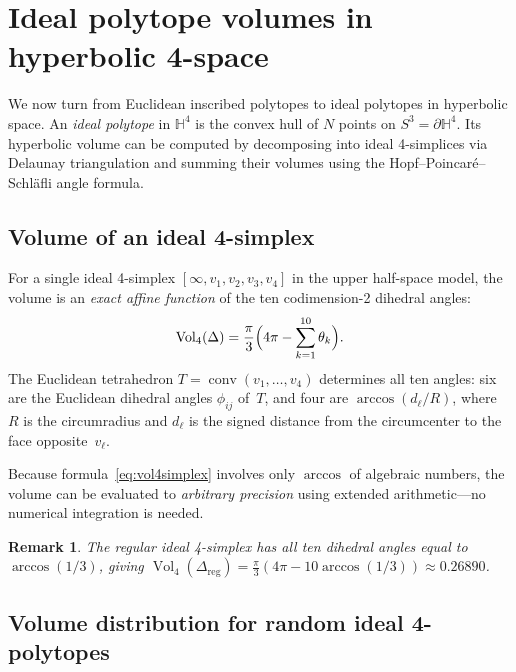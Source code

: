 \documentclass[11pt]{article}
\newtheorem{remark}{Remark}
\begin{document}
\section{Ideal polytope volumes in hyperbolic 4-space}\label{sec:hyp4d}

We now turn from Euclidean inscribed polytopes to ideal polytopes
in hyperbolic space.  An \emph{ideal polytope} in $\mathbb{H}^4$
is the convex hull of $N$ points on $S^3 = \partial\mathbb{H}^4$.
Its hyperbolic volume can be computed by decomposing into ideal
4-simplices via Delaunay triangulation and summing their volumes
using the Hopf--Poincar\'e--Schl\"afli angle formula.

\subsection{Volume of an ideal 4-simplex}

For a single ideal 4-simplex $[\infty, v_1, v_2, v_3, v_4]$ in
the upper half-space model, the volume is an \emph{exact affine
function} of the ten codimension-2 dihedral angles:
\begin{equation}\label{eq:vol4simplex}
  \operatorname{Vol}_4(\Delta)
  = \frac{\pi}{3}\Bigl(4\pi - \sum_{k=1}^{10}\theta_k\Bigr).
\end{equation}
The Euclidean tetrahedron $T = \operatorname{conv}(v_1,\ldots,v_4)$
determines all ten angles: six are the Euclidean dihedral angles
$\phi_{ij}$ of~$T$, and four are $\arccos(d_\ell/R)$, where $R$
is the circumradius and $d_\ell$ is the signed distance from the
circumcenter to the face opposite~$v_\ell$.

Because formula~\eqref{eq:vol4simplex} involves only $\arccos$
of algebraic numbers, the volume can be evaluated to \emph{arbitrary
precision} using extended arithmetic---no numerical integration
is needed.

\begin{remark}
The regular ideal 4-simplex has all ten dihedral angles equal to
$\arccos(1/3)$, giving
$\operatorname{Vol}_4(\Delta_{\mathrm{reg}})
= \frac{\pi}{3}(4\pi - 10\arccos(1/3)) \approx 0.26890$.
\end{remark}

\subsection{Volume distribution for random ideal 4-polytopes}
\end{document}
